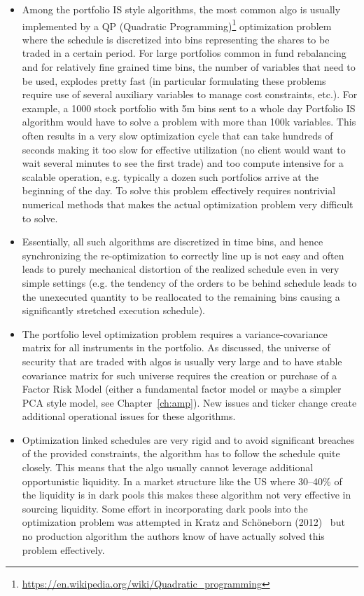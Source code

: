 \begin{itemize}
\item Among the portfolio IS style algorithms, the most common algo is usually implemented by a QP (Quadratic Programming)\footnote{\url{https://en.wikipedia.org/wiki/Quadratic_programming}} optimization problem where the schedule is discretized into bins representing the shares to be traded in a certain period. For large portfolios common in fund rebalancing and for relatively fine grained time bins, the number of variables that need to be used, explodes pretty fast (in particular formulating these problems require use of several auxiliary variables to manage cost constraints, etc.). For example, a 1000 stock portfolio with 5m bins  sent to a whole day Portfolio IS algorithm would have to solve a problem with more than 100k variables. This often results in a very slow  optimization cycle that can take hundreds of seconds making it too slow for effective utilization (no client would want to wait several minutes to see the first trade) and too compute intensive for a scalable operation, e.g. typically a dozen such portfolios arrive at the beginning of the day. To solve this problem effectively requires nontrivial numerical methods that makes the actual optimization problem very difficult to solve.

\item Essentially, all such algorithms are discretized in time bins, and hence synchronizing the re-optimization to correctly line up is not easy and often leads to purely mechanical distortion of the realized schedule even in very simple settings (e.g. the tendency of the orders to be behind schedule leads to the unexecuted quantity to be reallocated to the remaining bins causing a significantly stretched execution schedule).

\item The portfolio level optimization problem requires a variance-covariance matrix for all instruments in the portfolio. As discussed, the universe of security that are traded with algos is usually very large and to have stable covariance matrix for such universe requires the creation or purchase of a Factor Risk Model (either a fundamental factor model or maybe a simpler PCA style model, see Chapter~\ref{ch:amp}). New issues and ticker change create additional operational issues for these algorithms.

\item Optimization linked schedules are very rigid and to avoid significant breaches of the provided constraints, the algorithm has to follow the schedule quite closely. This means that the algo usually cannot leverage additional opportunistic liquidity. In a market structure like the US where 30--40\% of the liquidity is in dark pools this makes these algorithm not very effective in sourcing liquidity. Some effort in incorporating dark pools into the optimization problem was attempted in Kratz and Sch\"oneborn (2012)~\cite{kratzschon} but no production algorithm the authors know of have actually solved this problem effectively. 
\end{itemize}



